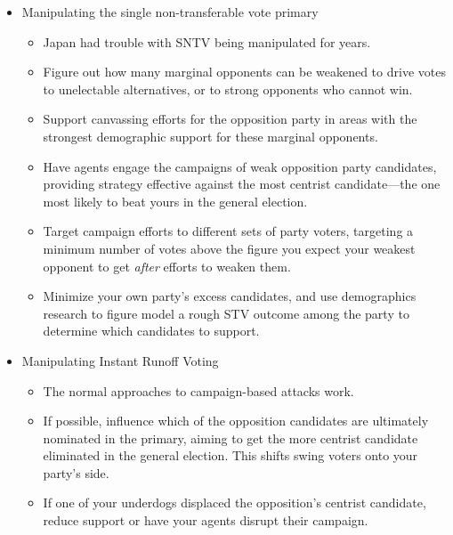 \begin{itemize}
    \item Manipulating the single non-transferable vote primary
    \begin{itemize}
        \item Japan had trouble with SNTV being manipulated for years.

        \item Figure out how many marginal opponents can be weakened to drive votes to unelectable alternatives, or to strong opponents who cannot win.

        \item Support canvassing efforts for the opposition party in areas with the strongest demographic support for these marginal opponents.

        \item Have agents engage the campaigns of weak opposition party candidates, providing strategy effective against the most centrist candidate—the one most likely to beat yours in the general election.

        \item Target campaign efforts to different sets of party voters, targeting a minimum number of votes above the figure you expect your weakest opponent to get \textit{after} efforts to weaken them.

        \item Minimize your own party's excess candidates, and use demographics research to figure model a rough STV outcome among the party to determine which candidates to support.
    \end{itemize}

    \item Manipulating Instant Runoff Voting
    \begin{itemize}
        \item The normal approaches to campaign-based attacks work.

        \item If possible, influence which of the opposition candidates are ultimately nominated in the primary, aiming to get the more centrist candidate eliminated in the general election.  This shifts swing voters onto your party's side.

        \item If one of your underdogs displaced the opposition's centrist candidate, reduce support or have your agents disrupt their campaign.
    \end{itemize}
\end{itemize}

